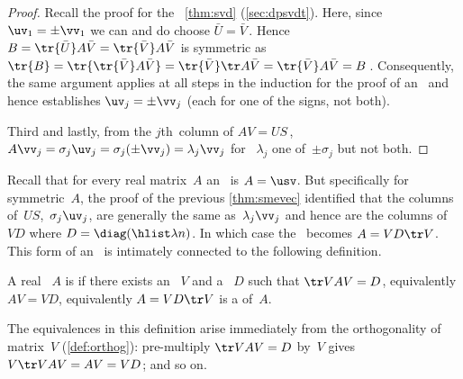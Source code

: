 \begin{proof}
Recall the  proof for the \svd\ \autoref{thm:svd}  (\autoref{sec:dpsvdt}).  
Here, since \(\uv_1=\pm\vv_1\) we can and do choose \(\bar U=\bar V\)\,.  
Hence \(B=\tr{\bar U}A\bar V =\tr{\bar V}A\bar V \) is symmetric as \(\tr{B} =\tr{\tr{\bar V}A\bar V} =\tr{\bar V}\tr A\bar V =\tr{\bar V}A\bar V =B\)\,.
Consequently, the same argument applies at all steps in the induction for the proof of an \svd\ and hence establishes \(\uv_j=\pm\vv_j\) (each for one of the signs, not both).

Third and lastly,  from the \(j\)th~column of \(AV=US\)\,, \(A\vv_j=\sigma_j\uv_j=\sigma_j(\pm \vv_j)=\lambda_j\vv_j\) for ~\(\lambda_j\) one of~\(\pm \sigma_j\) but not both.
\end{proof}

\begin{comment}
For duplicated \idx{singular value}s, there are \idx{eigenvector}s in the span of the \idx{singular vector}s.  
But appears difficult to prove.  
Could come down to solutions of \(Q^2=I\) for orthogonal matrix~\(Q\).
Equivalent to proving the Fundamental Theorem of Algebra that there are \(n\)~zeros of an \(n\)th~degree polynomial \pooliv{p.D8}.
\end{comment}


Recall that for every real matrix~\(A\) an \svd\ is \(A=\usv\).
But specifically for symmetric~\(A\), the proof of the previous \autoref{thm:smevec} identified that the columns of~\(US\),~\(\sigma_j\uv_j\), are generally the same as~\(\lambda_j\vv_j\) and hence are the columns of~\(VD\) where \(D=\diag(\hlist\lambda n)\).
In which case the \svd\ becomes \(A=VD\tr V\).
This form of an \svd\ is intimately connected to the following definition.


\begin{definition} \label{def:odsble} 
A real ~\(A\) is  if there exists an ~\(V\) and a ~\(D\) such that \(\tr VAV=D\), equivalently \(AV=VD\), equivalently \(A=VD\tr V\) is a  of~\(A\).
\end{definition}

The equivalences in this definition arise immediately from the orthogonality of matrix~\(V\) (\autoref{def:orthog}): pre-multiply \(\tr VAV=D\) by~\(V\) gives \(V\tr VAV=AV=VD\); and so on.

